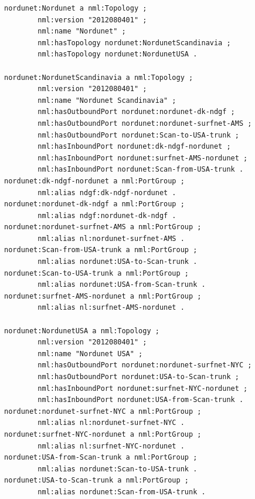 \documentclass{article}
\begin{document}
\begin{verbatim}
nordunet:Nordunet a nml:Topology ;
        nml:version "2012080401" ;
        nml:name "Nordunet" ;
        nml:hasTopology nordunet:NordunetScandinavia ;
        nml:hasTopology nordunet:NordunetUSA .

nordunet:NordunetScandinavia a nml:Topology ;
        nml:version "2012080401" ;
        nml:name "Nordunet Scandinavia" ;
        nml:hasOutboundPort nordunet:nordunet-dk-ndgf ;
        nml:hasOutboundPort nordunet:nordunet-surfnet-AMS ;
        nml:hasOutboundPort nordunet:Scan-to-USA-trunk ;
        nml:hasInboundPort nordunet:dk-ndgf-nordunet ;
        nml:hasInboundPort nordunet:surfnet-AMS-nordunet ;
        nml:hasInboundPort nordunet:Scan-from-USA-trunk .
nordunet:dk-ndgf-nordunet a nml:PortGroup ;
        nml:alias ndgf:dk-ndgf-nordunet .
nordunet:nordunet-dk-ndgf a nml:PortGroup ;
        nml:alias ndgf:nordunet-dk-ndgf .
nordunet:nordunet-surfnet-AMS a nml:PortGroup ;
        nml:alias nl:nordunet-surfnet-AMS .
nordunet:Scan-from-USA-trunk a nml:PortGroup ;
        nml:alias nordunet:USA-to-Scan-trunk .
nordunet:Scan-to-USA-trunk a nml:PortGroup ;
        nml:alias nordunet:USA-from-Scan-trunk .
nordunet:surfnet-AMS-nordunet a nml:PortGroup ;
        nml:alias nl:surfnet-AMS-nordunet .

nordunet:NordunetUSA a nml:Topology ;
        nml:version "2012080401" ;
        nml:name "Nordunet USA" ;
        nml:hasOutboundPort nordunet:nordunet-surfnet-NYC ;
        nml:hasOutboundPort nordunet:USA-to-Scan-trunk ;
        nml:hasInboundPort nordunet:surfnet-NYC-nordunet ;
        nml:hasInboundPort nordunet:USA-from-Scan-trunk .
nordunet:nordunet-surfnet-NYC a nml:PortGroup ;
        nml:alias nl:nordunet-surfnet-NYC .
nordunet:surfnet-NYC-nordunet a nml:PortGroup ;
        nml:alias nl:surfnet-NYC-nordunet .
nordunet:USA-from-Scan-trunk a nml:PortGroup ;
        nml:alias nordunet:Scan-to-USA-trunk .
nordunet:USA-to-Scan-trunk a nml:PortGroup ;
        nml:alias nordunet:Scan-from-USA-trunk .
\end{verbatim}
\end{document}
